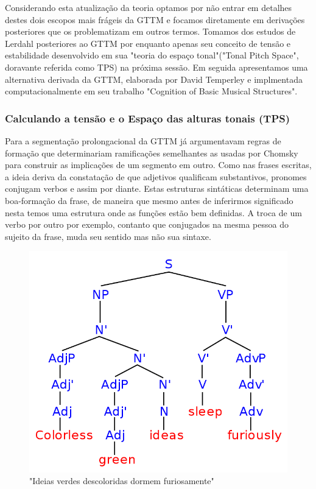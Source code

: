 \documentclass[
	12pt,				%
	openright,			%
	twoside,			%
	a4paper,			%
	english,			%
	french,				%
	spanish,			%
	brazil				%
	]{abntex2}
\begin{document}
Considerando esta atualização da teoria optamos por não entrar em detalhes destes dois escopos mais frágeis da GTTM e focamos diretamente em derivações posteriores que os problematizam em outros termos. Tomamos dos estudos de Lerdahl posteriores ao GTTM  por enquanto apenas seu conceito de tensão e estabilidade desenvolvido em sua "teoria do espaço tonal"("Tonal Pitch Space", doravante referida como TPS) na próxima sessão. Em seguida apresentamos uma alternativa derivada da GTTM, elaborada por David Temperley e implmentada computacionalmente em seu trabalho "Cognition of Basic Musical Structures"\cite{temperley2001cognition}.



\pagebreak
\subsubsection{Calculando a tensão e o Espaço das alturas tonais (TPS) }


Para a segmentação prolongacional da GTTM  já argumentavam regras de formação que determinariam ramificações semelhantes as usadas por Chomsky\cite{chomsky1957syntactic} para construir as implicações de um segmento em outro. Como nas frases escritas, a ideia deriva da constatação de que adjetivos qualificam substantivos, pronomes conjugam verbos e assim por diante. Estas estruturas sintáticas determinam uma boa-formação da frase, de maneira que mesmo antes de inferirmos significado nesta temos uma estrutura onde as funções estão bem definidas. A troca de um verbo por outro por exemplo, contanto que conjugados na mesma pessoa do sujeito da frase, muda seu sentido mas não sua sintaxe.

\begin{figure}[!h]
	\caption{\label{fig_grafico}"Ideias verdes descoloridas dormem furiosamente"\cite{chomsky1957syntactic}}
	\begin{center}
	    \includegraphics[scale=0.45]{gttm/colorless.png}
	\end{center}
\end{figure}
\end{document}
